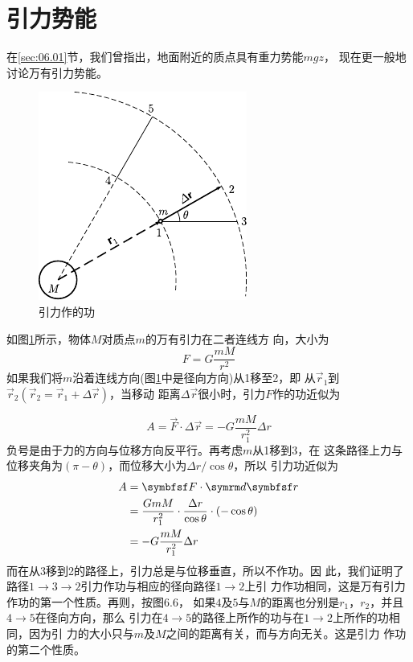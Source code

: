 \section{引力势能}\label{sec:06.03}

在\ref{sec:06.01}节，我们曾指出，地面附近的质点具有重力势能$ mgz $，
现在更一般地讨论万有引力势能。

\begin{figure}
    \vspace{-1.56em}
    \centering
    \includegraphics{figure/fig06.06}
    \caption{引力作的功}
    \label{fig:06.06}
\end{figure}
如图\ref{fig:06.06}\;所示，物体$ M $对质点$ m $的万有引力在二者连线方
向，大小为%
\begin{equation*}
 F = G \frac { m M } { r ^ { 2 } }
\end{equation*}
如果我们将$ m $沿着连线方向(图\ref{fig:06.06}\;中是径向方向)从1移至2，即
从$ \vec{r} _ 1 $到$ \vec{r} _ 2 ( \vec{r} _ 2 = \vec{r} _ 1 + \Delta \vec{r} ) $，当移动
距离$ \Delta \vec{r} $很小时，引力$ F $作的功近似为

\clearpage\mbox{}\vspace{-1.56em}
\begin{equation*}
 A = \vec{F} \cdot \Delta \vec{r} = - G \frac { m M } { r _ 1 ^ { 2 } } \Delta r
\end{equation*}
负号是由于力的方向与位移方向反平行。再考虑$ m $从1移到3，在
这条路径上力与位移夹角为$ ( \pi - \theta ) $，而位移大小为$ \Delta r / \cos \theta $，所以
引力功近似为
\begin{equation*}
 \begin{aligned}
 A &= \vec{F} \cdot \dif \vec{r} \\
 &= \frac { G m M } { r _ { 1 } ^ { 2 } } \cdot \frac { \Delta r } { \cos \theta } \cdot ( - \cos \theta ) \\
 &= - G \frac { m M } { r _ 1 ^ { 2 } } \Delta r
 \end{aligned}
\end{equation*}
而在从3移到2的路径上，引力总是与位移垂直，所以不作功。因
此，我们证明了路径$1 \to 3 \to 2$引力作功与相应的径向路径$ 1 \to 2 $上引
力作功相同，这是万有引力作功的第一个性质。再则，按图6.6，
如果$ 4 $及$ 5 $与$ M $的距离也分别是$ r_1 $，$ r_2 $，并且$ 4 \to 5 $在径向方向，那么
引力在$ 4 \to 5 $的路径上所作的功与在$ 1 \to 2 $上所作的功相同，因为引
力的大小只与$ m $及$ M $之间的距离有关，而与方向无关。这是引力
作功的第二个性质。

